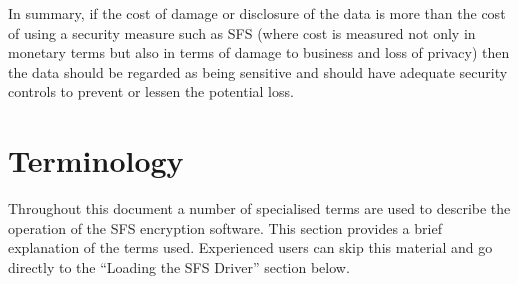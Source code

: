 In summary, if the cost of damage or disclosure of the data is more than the
cost of using a security measure such as SFS (where cost is measured not only
in monetary terms but also in terms of damage to business and loss of privacy)
then the data should be regarded as being sensitive and should have adequate
security controls to prevent or lessen the potential loss.




\section{Terminology}

Throughout this document a number of specialised terms are used to describe the
operation of the SFS encryption software.  This section provides a brief
explanation of the terms used.  Experienced users can skip this material and go
directly to the ``Loading the SFS Driver'' section below.

